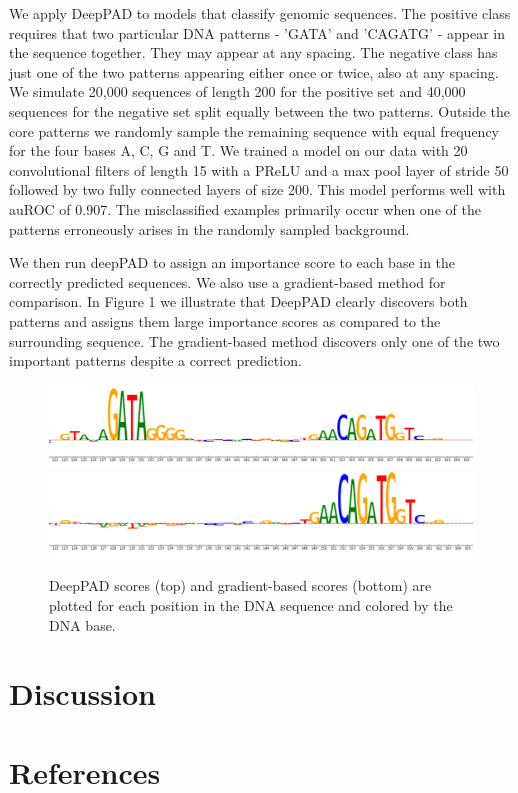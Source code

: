 \documentclass{article}
\begin{document}
We apply DeepPAD to models that classify genomic sequences. The positive class requires that two particular DNA patterns - 'GATA' and 'CAGATG' - appear in the sequence together. They may appear at any spacing. The negative class has just one of the two patterns appearing either once or twice, also at any spacing. We simulate 20,000 sequences of length 200 for the positive set and 40,000 sequences for the negative set split equally between the two patterns. Outside the core patterns we randomly sample the remaining sequence with equal frequency for the four bases A, C, G and T. We trained a model on our data with 20 convolutional filters of length 15 with a PReLU and a max pool layer of stride 50 followed by two fully connected layers of size 200. This model performs well with auROC of 0.907. The misclassified examples primarily occur when one of the patterns erroneously arises in the randomly sampled background.  %

We then run deepPAD to assign an importance score to each base in the correctly predicted sequences. We also use a gradient-based method for comparison. In Figure 1 we illustrate that DeepPAD clearly discovers both patterns and assigns them large importance scores as compared to the surrounding sequence. The gradient-based method discovers only one of the two important patterns despite a correct prediction.

\begin{figure}[!htmb]
\begin{center}
\includegraphics[scale=0.3]{DeepPADSequence2.png}
\includegraphics[scale=0.3]{GradientSequence2.png}
\caption{DeepPAD scores (top) and gradient-based scores (bottom) are plotted for each position in the DNA sequence and colored by the DNA base.}
\end{center}
\end{figure}
 

\section{Discussion}

\section{References}
\end{document}
